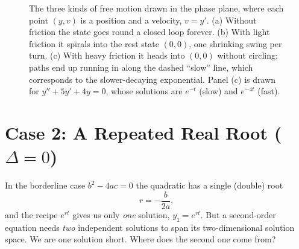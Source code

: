 \begin{figure}[htbp]
\caption{The three kinds of free motion drawn in the phase plane, where each point
$(y, v)$ is a position and a velocity, $v = y'$. (a) Without friction the state
goes round a closed loop forever. (b) With light friction it spirals into the rest
state $(0,0)$, one shrinking swing per turn. (c) With heavy friction it heads into
$(0,0)$ without circling; paths end up running in along the dashed ``slow''
line, which corresponds to the slower-decaying exponential. Panel (c) is drawn for
$y''+5y'+4y=0$, whose solutions are $e^{-t}$ (slow) and $e^{-4t}$ (fast).}
\label{ch38:fig-phase-space-comparison}
\end{figure}

\section{Case 2: A Repeated Real Root \texorpdfstring{($\Delta = 0$)}{(Delta = 0)}}
\label{ch38:repeated-root}

In the borderline case $b^2 - 4ac = 0$ the
quadratic has a single (double) root
\[
  r = -\frac{b}{2a},
\]
and the recipe $e^{rt}$ gives us only \emph{one} solution, $y_1 = e^{rt}$. But a
second-order equation needs \emph{two} independent solutions to span its
two-dimensional solution space. We are one solution short. Where does the second
one come from?

